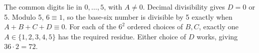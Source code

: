 The common digits lie in $0,\ldots,5$, with $A\ne0$. Decimal divisibility gives $D=0$ or 5. Modulo 5, $6\equiv1$, so the base-six number is divisible by 5 exactly when $A+B+C+D\equiv0$. For each of the $6^2$ ordered choices of $B,C$, exactly one $A\in\{1,2,3,4,5\}$ has the required residue. Either choice of $D$ works, giving $\boxed{36\cdot2=72}$.

